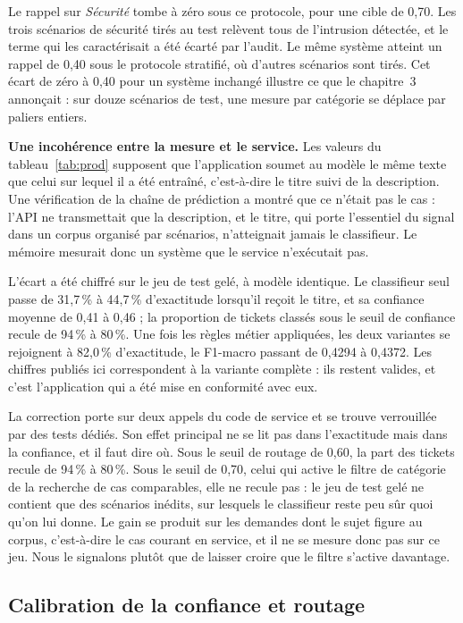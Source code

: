 Le rappel sur \emph{Sécurité} tombe à zéro sous ce protocole, pour une cible de 0,70. Les trois
scénarios de sécurité tirés au test relèvent tous de l'intrusion détectée, et le terme qui les
caractérisait a été écarté par l'audit. Le même système atteint un rappel de 0,40 sous le protocole
stratifié, où d'autres scénarios sont tirés. Cet écart de zéro à 0,40 pour un système inchangé
illustre ce que le chapitre~3 annonçait : sur douze scénarios de test, une mesure par catégorie se
déplace par paliers entiers.

\textbf{Une incohérence entre la mesure et le service.} Les valeurs du tableau~\ref{tab:prod} supposent que l'application soumet au modèle le
même texte que celui sur lequel il a été entraîné, c'est-à-dire le titre suivi de la description.
Une vérification de la chaîne de prédiction a montré que ce n'était pas le cas : l'API ne
transmettait que la description, et le titre, qui porte l'essentiel du signal dans un corpus
organisé par scénarios, n'atteignait jamais le classifieur. Le mémoire mesurait donc un système que
le service n'exécutait pas.

L'écart a été chiffré sur le jeu de test gelé, à modèle identique. Le classifieur seul passe de
31,7\,\% à 44,7\,\% d'exactitude lorsqu'il reçoit le titre, et sa confiance moyenne de 0,41 à 0,46 ;
la proportion de tickets classés sous le seuil de confiance recule de 94\,\% à 80\,\%. Une fois les
règles métier appliquées, les deux variantes se rejoignent à 82,0\,\% d'exactitude, le F1-macro
passant de 0,4294 à 0,4372. Les chiffres publiés ici correspondent à la variante complète : ils
restent valides, et c'est l'application qui a été mise en conformité avec eux.

La correction porte sur deux appels du code de service et se trouve verrouillée par des tests
dédiés. Son effet principal ne se lit pas dans l'exactitude mais dans la confiance, et il faut dire
où. Sous le seuil de routage de 0,60, la part des tickets recule de 94\,\% à 80\,\%. Sous le seuil
de 0,70, celui qui active le filtre de catégorie de la recherche de cas comparables, elle ne recule
pas : le jeu de test gelé ne contient que des scénarios inédits, sur lesquels le classifieur reste
peu sûr quoi qu'on lui donne. Le gain se produit sur les demandes dont le sujet figure au corpus,
c'est-à-dire le cas courant en service, et il ne se mesure donc pas sur ce jeu. Nous le signalons
plutôt que de laisser croire que le filtre s'active davantage.

\subsection{Calibration de la confiance et routage}

